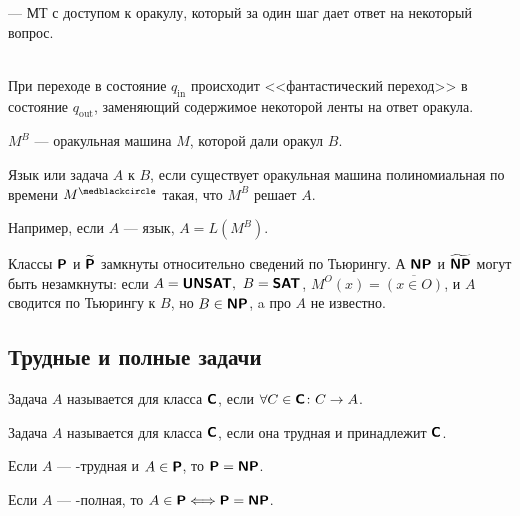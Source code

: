\begin{defn}[Оракульная МТ]
	 --- МТ с доступом к оракулу, который за один шаг дает ответ на некоторый вопрос.
\end{defn}
\begin{name}
	~\\
	При переходе в состояние $ q_{\text{in}}$ происходит <<фантастический переход>> в состояние $ q_{\text{out}}$, заменяющий содержимое некоторой ленты на ответ оракула.

	\noindent$ M^{B}$ --- оракульная машина $ M$, которой дали оракул $ B$. 
\end{name}

\begin{defn}
	Язык или задача $ A$  к $ B$, если существует оракульная машина полиномиальная по времени $ M^{\medblackcircle}$ такая, что $ M^{B}$ решает $ A$.

	\noindent
	Например, если  $ A$ ---  язык, $ A = L(M^{B})$.
\end{defn}
\begin{ex}
	Классы $\P$ и $\tP$ замкнуты относительно сведений по Тьюрингу. А $\NP$ и $\tNP$ могут быть незамкнуты: если $A = \UNSAT,~ B = \SAT$, $ M^{O}(x) = \overline{(x \in O)}$, и $ A$ сводится по Тьюрингу к $ B$, но $ B \in \NP$, a про $ A$ не известно.
\end{ex}

\subsection{Трудные и полные задачи}
\begin{defn}
	Задача $ A$ называется  для класса $\Class$, если  $ \forall C \in \Class \colon C \to A$.

	\noindent
	Задача $ A$ называется  для класса $ \Class$, если она трудная и принадлежит $ \Class$.
\end{defn}

\begin{thm}
    Если $ A$ --- \NP-трудная и $ A \in \P$, то $ \P = \NP$.
\end{thm}
\begin{cor}
    Если $ A$ --- \NP-полная, то $
    A \in \P \Longleftrightarrow \P = \NP
    $. 
\end{cor}

